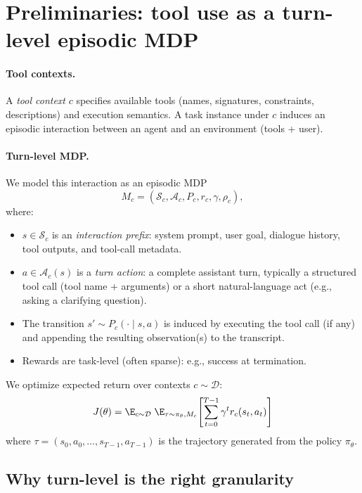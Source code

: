 \section{Preliminaries: tool use as a turn-level episodic MDP}
\label{sec:mdp}

\paragraph{Tool contexts.}
A \emph{tool context} $c$ specifies available tools (names, signatures, constraints, descriptions) and execution semantics.
A task instance under $c$ induces an episodic interaction between an agent and an environment (tools + user).

\paragraph{Turn-level MDP.}
We model this interaction as an episodic MDP
\[
M_c = (\mathcal{S}_c, \mathcal{A}_c, P_c, r_c, \gamma, \rho_c),
\]
where:
\begin{itemize}
    \item $s\in\mathcal{S}_c$ is an \emph{interaction prefix}: system prompt, user goal, dialogue history, tool outputs, and tool-call metadata.
    \item $a\in\mathcal{A}_c(s)$ is a \emph{turn action}: a complete assistant turn, typically a structured tool call (tool name + arguments) or a short natural-language act (e.g., asking a clarifying question).
    \item The transition $s'\sim P_c(\cdot\mid s,a)$ is induced by executing the tool call (if any) and appending the resulting observation(s) to the transcript.
    \item Rewards are task-level (often sparse): e.g., success at termination.
\end{itemize}

We optimize expected return over contexts $c\sim\mathcal{D}$:
\begin{equation}
\label{eq:objective}
J(\theta)
=
\E_{c\sim\mathcal{D}}\;
\E_{\tau\sim\pi_\theta, M_c}\!\left[\sum_{t=0}^{T-1}\gamma^t r_c(s_t,a_t)\right]
\end{equation}
where $\tau = (s_0,a_0,\dots,s_{T-1},a_{T-1})$ is the trajectory generated from the policy $\pi_\theta$.

\subsection{Why turn-level is the right granularity}

